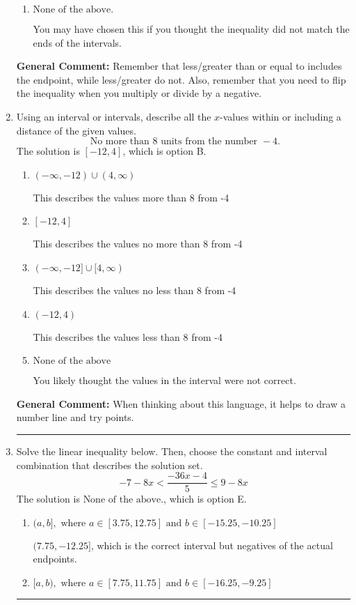 \documentclass{extbook}[14pt]
\newcommand{\litem}[1]{\item #1

\rule{\textwidth}{0.4pt}}
\begin{document}
\begin{enumerate}
{\begin{enumerate}[label=\Alph*.]
 $(-\infty, 1.077]$, which corresponds to switching the direction of the interval. You likely did this if you did not flip the inequality when dividing by a negative!
\item \( \text{None of the above}. \)

You may have chosen this if you thought the inequality did not match the ends of the intervals.
\end{enumerate}

\textbf{General Comment:} Remember that less/greater than or equal to includes the endpoint, while less/greater do not. Also, remember that you need to flip the inequality when you multiply or divide by a negative.
}
\litem{
Using an interval or intervals, describe all the $x$-values within or including a distance of the given values.
\[ \text{ No more than } 8 \text{ units from the number } -4. \]The solution is \( [-12, 4] \), which is option B.\begin{enumerate}[label=\Alph*.]
\item \( (-\infty, -12) \cup (4, \infty) \)

This describes the values more than 8 from -4
\item \( [-12, 4] \)

This describes the values no more than 8 from -4
\item \( (-\infty, -12] \cup [4, \infty) \)

This describes the values no less than 8 from -4
\item \( (-12, 4) \)

This describes the values less than 8 from -4
\item \( \text{None of the above} \)

You likely thought the values in the interval were not correct.
\end{enumerate}

\textbf{General Comment:} When thinking about this language, it helps to draw a number line and try points.
}
\litem{
Solve the linear inequality below. Then, choose the constant and interval combination that describes the solution set.
\[ -7 - 8 x < \frac{-36 x - 4}{5} \leq 9 - 8 x \]The solution is \( \text{None of the above.} \), which is option E.\begin{enumerate}[label=\Alph*.]
\item \( (a, b], \text{ where } a \in [3.75, 12.75] \text{ and } b \in [-15.25, -10.25] \)

$(7.75, -12.25]$, which is the correct interval but negatives of the actual endpoints.
\item \( [a, b), \text{ where } a \in [7.75, 11.75] \text{ and } b \in [-16.25, -9.25] \)


\end{enumerate}}
\end{enumerate}
\end{document}
